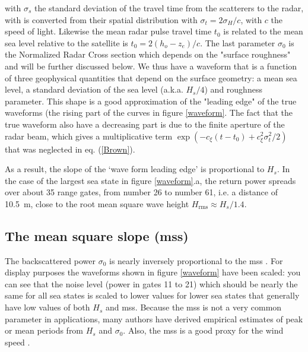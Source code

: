with $\sigma_s$ the standard deviation of the travel time from the scatterers to the radar, with is converted from their spatial distribution with $\sigma_t= 2 \sigma_H / c$, with $c$ the speed of light. Likewise the mean radar pulse travel time $t_0$ is related to the mean sea level relative to the satellite is $t_0=2(h_o- z_e)/c$. The last parameter $ \sigma_0$ is the Normalized Radar Cross section which depends on the "surface roughness" and will be further discussed below. We thus have a waveform that is a function of three geophysical quantities that depend on the surface geometry: a mean sea level, a standard deviation of the sea level (a.k.a. $H_s/4$) and roughness parameter. This shape is a good approximation of the "leading edge" of the true waveforms (the rising part of the curves in figure \ref{waveform}. The fact that the true waveform also have a decreasing part is due to the finite aperture of the 
radar beam, which gives a multiplicative term $\exp(-c_\xi (t-t_0)+c_\xi^2 \sigma_t^2/2)$ that was neglected in eq. (\ref{Brown}).  %


As a result, 
the slope of the `wave form leading edge' is proportional to  $H_s$.  
In the case of the largest sea state in figure \ref{waveform}.a, the return 
power spreads over about 35 range gates, from number 26 to number 61, i.e. a distance of 10.5~m, close to the root mean square wave height
 $H_{\mathrm{rms}} \approx  H_{s}/1.4$. %

\subsection{The mean square slope (mss)}
The backscattered power $\sigma_0$ is nearly inversely proportional to the mss \citep{Vandemark&al.2002}. 
For display purposes the waveforms shown in figure \ref{waveform} have been scaled: you can see that the noise level (power in gates 11 to 21) which should be nearly the same for 
all sea states is scaled to lower values for lower sea states that generally have low values of both $H_s$ and mss.  
Because the mss is not a very common parameter in applications, many authors have derived empirical estimates of peak or mean  periods from $H_s$ and $\sigma_0$. Also, the mss is a good proxy for the wind speed \citep{Cox&Munk1954}.





